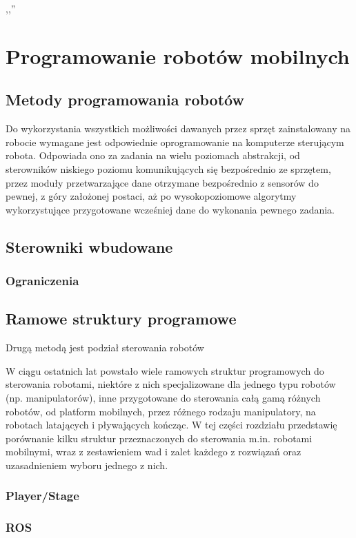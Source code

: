 

\begin{savequote}[70mm]
,,''
\qauthor{}
\end{savequote}


\chapter{Programowanie robotów mobilnych}
\label{chap:programowanie}

\section{Metody programowania robotów}

Do wykorzystania wszystkich możliwości dawanych przez sprzęt zainstalowany na robocie
wymagane jest odpowiednie oprogramowanie na komputerze sterującym robota. Odpowiada
ono za zadania na wielu poziomach abstrakcji, od sterowników niskiego poziomu
komunikujących się bezpośrednio ze sprzętem, przez moduły przetwarzające dane otrzymane
bezpośrednio z sensorów do pewnej, z góry założonej postaci, aż po wysokopoziomowe
algorytmy wykorzystujące przygotowane wcześniej dane do wykonania pewnego zadania.

\section{Sterowniki wbudowane}

\subsection{Ograniczenia}

\section{Ramowe struktury programowe}

Drugą metodą jest podział sterowania robotów 

W ciągu ostatnich lat powstało wiele ramowych struktur programowych do sterowania
robotami, niektóre z nich specjalizowane dla jednego typu robotów (np. manipulatorów),
inne przygotowane do sterowania całą gamą różnych robotów, od platform mobilnych,
przez różnego rodzaju manipulatory, na robotach latających i pływających kończąc.
W tej części rozdziału przedstawię porównanie kilku struktur przeznaczonych do
sterowania m.in. robotami mobilnymi, wraz z zestawieniem wad i zalet każdego z rozwiązań
oraz uzasadnieniem wyboru jednego z nich.


\subsection{Player/Stage}

\cite{gerkey03playerstage}

\subsection{ROS}

\cite{288}
